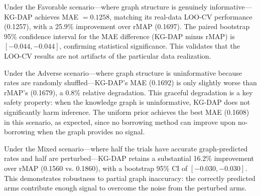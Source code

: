 \documentclass[12pt]{article}
\begin{document}
Under the Favorable scenario---where graph structure is genuinely informative---KG-DAP achieves MAE $= 0.1258$, matching its real-data LOO-CV performance (0.1257), with a 25.9\% improvement over rMAP (0.1697). The paired bootstrap 95\% confidence interval for the MAE difference (KG-DAP minus rMAP) is $[-0.044, -0.044]$, confirming statistical significance. This validates that the LOO-CV results are not artifacts of the particular data realization.

Under the Adverse scenario---where graph structure is uninformative because rates are randomly shuffled---KG-DAP's MAE (0.1692) is only slightly worse than rMAP's (0.1679), a 0.8\% relative degradation. This graceful degradation is a key safety property: when the knowledge graph is uninformative, KG-DAP does not significantly harm inference. The uniform prior achieves the best MAE (0.1608) in this scenario, as expected, since no borrowing method can improve upon no-borrowing when the graph provides no signal.

Under the Mixed scenario---where half the trials have accurate graph-predicted rates and half are perturbed---KG-DAP retains a substantial 16.2\% improvement over rMAP (0.1560 vs. 0.1860), with a bootstrap 95\% CI of $[-0.030, -0.030]$. This demonstrates robustness to partial graph inaccuracy: the correctly predicted arms contribute enough signal to overcome the noise from the perturbed arms.
\end{document}
